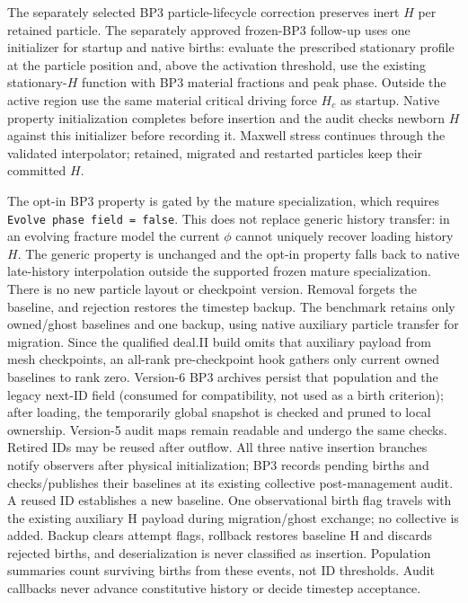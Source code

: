 \documentclass[11pt]{article}
\begin{document}
The separately selected BP3 particle-lifecycle correction preserves inert $H$
per retained particle. The separately approved frozen-BP3 follow-up uses one
initializer for startup and native births: evaluate the prescribed stationary
profile at the particle position and, above the activation threshold, use the
existing stationary-$H$ function with BP3 material fractions and peak phase.
Outside the active region use the same material critical driving force $H_c$ as
startup. Native property initialization completes before insertion and the audit
checks newborn $H$ against this initializer before recording it. Maxwell stress
continues through the validated interpolator; retained, migrated and restarted
particles keep their committed $H$.

The opt-in BP3 property is gated by the mature specialization, which requires
\texttt{Evolve phase field = false}. This does not replace generic history
transfer: in an evolving fracture model the current $\phi$ cannot uniquely
recover loading history $H$. The generic property is unchanged and the opt-in
property falls back to native late-history interpolation outside the supported
frozen mature specialization. There is no new particle layout or checkpoint
version. Removal forgets the baseline, and rejection restores the timestep backup.
The benchmark
retains only owned/ghost baselines and one backup, using native auxiliary
particle transfer for migration. Since the qualified deal.II build omits that
auxiliary payload from mesh checkpoints, an all-rank pre-checkpoint hook gathers
only current owned baselines to rank zero. Version-6 BP3 archives persist that
population and the legacy next-ID field (consumed for compatibility, not used
as a birth criterion); after loading, the temporarily global
snapshot is checked and pruned to local ownership. Version-5 audit maps remain
readable and undergo the same checks. Retired IDs may be reused after outflow.
All three native insertion branches notify observers after physical initialization;
BP3 records pending births and checks/publishes their baselines at its existing
collective post-management audit. A reused ID establishes a new baseline. One
observational birth flag travels with the existing auxiliary H payload during
migration/ghost exchange; no collective is added. Backup clears attempt flags,
rollback restores baseline H and discards rejected births, and deserialization
is never classified as insertion. Population summaries count surviving births
from these events, not ID thresholds. Audit callbacks never advance constitutive
history or decide timestep acceptance.
\end{document}
